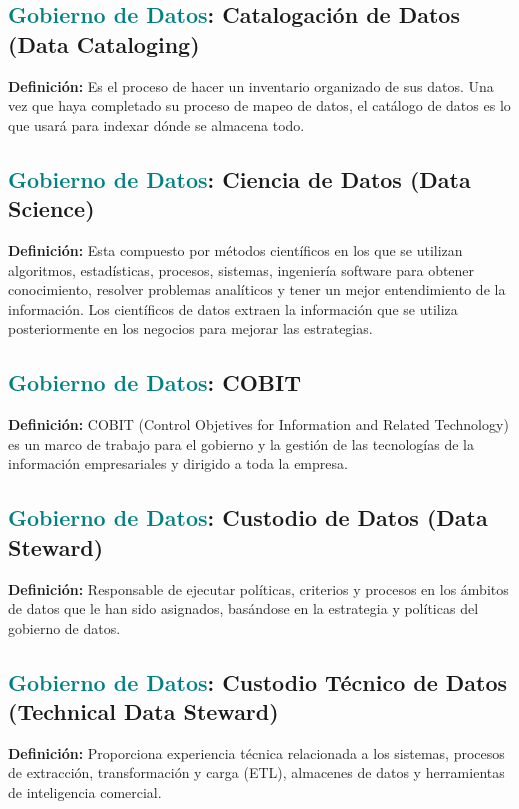 \documentclass[12pt]{article}
\begin{document}
\subsection{\textcolor{teal}{Gobierno de Datos}: Catalogación de Datos (Data Cataloging)}
\textbf{Definición:} Es el proceso de hacer un inventario organizado de sus datos. Una vez que haya completado su proceso de mapeo de datos, el catálogo de datos es lo que usará para indexar dónde se almacena todo.
\subsection{\textcolor{teal}{Gobierno de Datos}: Ciencia de Datos (Data Science)}
\textbf{Definición:} Esta compuesto por métodos científicos en los que se utilizan algoritmos, estadísticas, procesos, sistemas, ingeniería software para obtener conocimiento, resolver problemas analíticos y tener un mejor entendimiento de la información. Los científicos de datos extraen la información que se utiliza posteriormente en los negocios para mejorar las estrategias.
\subsection{\textcolor{teal}{Gobierno de Datos}: COBIT}
\textbf{Definición:} COBIT (Control Objetives for Information and Related Technology) es un marco de trabajo para el gobierno y la gestión de las tecnologías de la información empresariales y dirigido a toda la empresa.
\subsection{\textcolor{teal}{Gobierno de Datos}: Custodio de Datos (Data Steward)}
\textbf{Definición:} Responsable de ejecutar políticas, criterios y procesos en los ámbitos de datos que le han sido asignados, basándose en la estrategia y políticas del gobierno de datos.
\subsection{\textcolor{teal}{Gobierno de Datos}: Custodio Técnico de Datos (Technical Data Steward)}
\textbf{Definición:} Proporciona experiencia técnica relacionada a los sistemas, procesos de extracción, transformación y carga (ETL), almacenes de datos y herramientas de inteligencia comercial.
\end{document}
